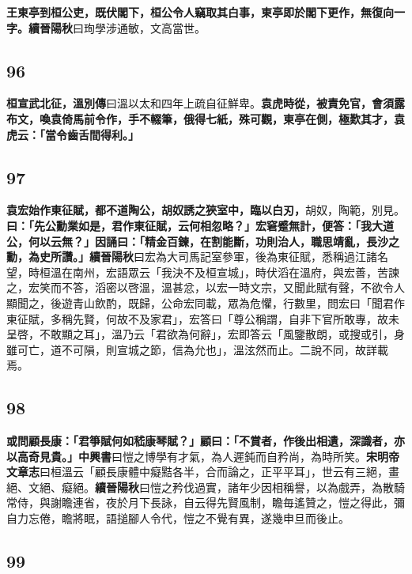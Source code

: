 \textbf{王東亭到桓公吏，既伏閣下，桓公令人竊取其白事，東亭即於閣下更作，無復向一字。}{\footnotesize \textbf{續晉陽秋}曰珣學涉通敏，文高當世。}

\subsection*{96}

\textbf{桓宣武北征，}{\footnotesize \textbf{溫別傳}曰溫以太和四年上疏自征鮮卑。}\textbf{袁虎時從，被責免官，會須露布文，喚袁倚馬前令作，手不輟筆，俄得七紙，殊可觀，東亭在側，極歎其才，袁虎云：「當令齒舌間得利。」}

\subsection*{97}

\textbf{袁宏始作東征賦，都不道陶公，胡奴誘之狹室中，臨以白刃，}{\footnotesize 胡奴，陶範，別見。}\textbf{曰：「先公勳業如是，君作東征賦，云何相忽略？」宏窘蹙無計，便答：「我大道公，何以云無？」因誦曰：「精金百鍊，在割能斷，功則治人，職思靖亂，長沙之勳，為史所讚。」}{\footnotesize \textbf{續晉陽秋}曰宏為大司馬記室參軍，後為東征賦，悉稱過江諸名望，時桓溫在南州，宏語眾云「我決不及桓宣城」，時伏滔在溫府，與宏善，苦諫之，宏笑而不答，滔密以啓溫，溫甚忿，以宏一時文宗，又聞此賦有聲，不欲令人顯聞之，後遊青山飲酌，既歸，公命宏同載，眾為危懼，行數里，問宏曰「聞君作東征賦，多稱先賢，何故不及家君」，宏答曰「尊公稱謂，自非下官所敢專，故未呈啓，不敢顯之耳」，溫乃云「君欲為何辭」，宏即答云「風鑒散朗，或搜或引，身雖可亡，道不可隕，則宣城之節，信為允也」，溫泫然而止。二說不同，故詳載焉。}

\subsection*{98}

\textbf{或問顧長康：「君箏賦何如嵇康琴賦？」顧曰：「不賞者，作後出相遺，深識者，亦以高奇見貴。」}{\footnotesize \textbf{中興書}曰愷之博學有才氣，為人遲鈍而自矜尚，為時所笑。\textbf{宋明帝文章志}曰桓溫云「顧長康體中癡黠各半，合而論之，正平平耳」，世云有三絕，畫絕、文絕、癡絕。\textbf{續晉陽秋}曰愷之矜伐過實，諸年少因相稱譽，以為戲弄，為散騎常侍，與謝瞻連省，夜於月下長詠，自云得先賢風制，瞻毎遙贊之，愷之得此，彌自力忘倦，瞻將眠，語搥腳人令代，愷之不覺有異，遂幾申旦而後止。}

\subsection*{99}

